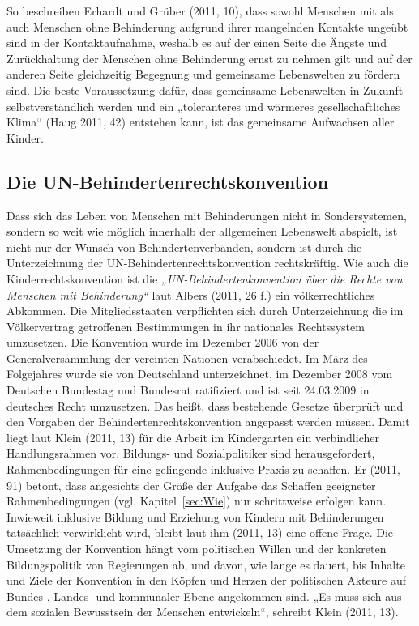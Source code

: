 So beschreiben Erhardt und Grüber (2011, 10), dass sowohl Menschen mit als auch Menschen ohne Behinderung aufgrund ihrer mangelnden Kontakte ungeübt sind in der Kontaktaufnahme, weshalb es auf der einen Seite die Ängste und Zurückhaltung der Menschen ohne Behinderung ernst zu nehmen gilt und auf der anderen Seite gleichzeitig Begegnung und gemeinsame Lebenswelten zu fördern sind. Die beste Voraussetzung dafür, dass gemeinsame Lebenswelten in Zukunft selbstverständlich werden und ein „toleranteres und wärmeres gesellschaftliches Klima“ (Haug 2011, 42) entstehen kann, ist das gemeinsame Aufwachsen aller Kinder. 

\subsection{Die UN-Behindertenrechtskonvention}
\label{sec:BRK}
Dass sich das Leben von Menschen mit Behinderungen nicht in Sondersystemen, sondern so weit wie möglich innerhalb der allgemeinen Lebenswelt abspielt, ist nicht nur der Wunsch von Behindertenverbänden, sondern ist durch die Unterzeichnung der UN-Behindertenrechtskonvention rechtskräftig. Wie auch die Kinderrechtskonvention ist die \emph{„UN-Behindertenkonvention über die Rechte von Menschen mit Behinderung“} laut Albers (2011, 26 f.) ein völkerrechtliches Abkommen. Die Mitgliedsstaaten verpflichten sich durch Unterzeichnung die im Völkervertrag getroffenen Bestimmungen in ihr nationales Rechtssystem umzusetzen. Die Konvention wurde im Dezember 2006 von der Generalversammlung der vereinten Nationen verabschiedet. Im März des Folgejahres wurde sie von Deutschland unterzeichnet, im Dezember 2008 vom Deutschen Bundestag und Bundesrat ratifiziert und ist seit 24.03.2009 in deutsches Recht umzusetzen. Das heißt, dass bestehende Gesetze überprüft und den Vorgaben der Behindertenrechtskonvention angepasst werden müssen. Damit liegt laut Klein (2011, 13) für die Arbeit im Kindergarten ein verbindlicher Handlungsrahmen vor. Bildungs- und Sozialpolitiker sind herausgefordert, Rahmenbedingungen für eine gelingende inklusive Praxis zu schaffen. Er (2011, 91) betont, dass angesichts der Größe der Aufgabe das Schaffen geeigneter Rahmenbedingungen (vgl. Kapitel~\ref{sec:Wie}) nur schrittweise erfolgen kann. Inwieweit inklusive Bildung und Erziehung von Kindern mit Behinderungen tatsächlich verwirklicht wird, bleibt laut ihm (2011, 13) eine offene Frage. Die Umsetzung der Konvention hängt vom politischen Willen und der konkreten Bildungspolitik von Regierungen ab, und davon, wie lange es dauert, bis Inhalte und Ziele der Konvention in den Köpfen und Herzen der politischen Akteure auf Bundes-, Landes- und kommunaler Ebene angekommen sind. „Es muss sich aus dem sozialen Bewusstsein der Menschen entwickeln“, schreibt Klein (2011, 13). 


